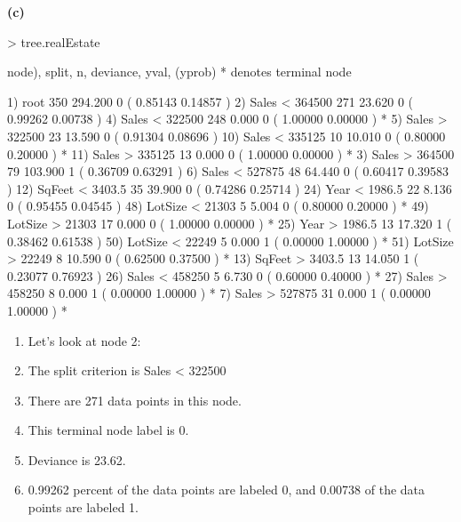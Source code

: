 \documentclass[a4paper]{article}
\renewcommand{\part}[1] {\vspace{.10in} {\bf (#1)}}
\begin{document}
\part{c}
\begin{Schunk}
\begin{Sinput}
> tree.realEstate
\end{Sinput}
\begin{Soutput}
node), split, n, deviance, yval, (yprob)
      * denotes terminal node

 1) root 350 294.200 0 ( 0.85143 0.14857 )  
   2) Sales < 364500 271  23.620 0 ( 0.99262 0.00738 )  
     4) Sales < 322500 248   0.000 0 ( 1.00000 0.00000 ) *
     5) Sales > 322500 23  13.590 0 ( 0.91304 0.08696 )  
      10) Sales < 335125 10  10.010 0 ( 0.80000 0.20000 ) *
      11) Sales > 335125 13   0.000 0 ( 1.00000 0.00000 ) *
   3) Sales > 364500 79 103.900 1 ( 0.36709 0.63291 )  
     6) Sales < 527875 48  64.440 0 ( 0.60417 0.39583 )  
      12) SqFeet < 3403.5 35  39.900 0 ( 0.74286 0.25714 )  
        24) Year < 1986.5 22   8.136 0 ( 0.95455 0.04545 )  
          48) LotSize < 21303 5   5.004 0 ( 0.80000 0.20000 ) *
          49) LotSize > 21303 17   0.000 0 ( 1.00000 0.00000 ) *
        25) Year > 1986.5 13  17.320 1 ( 0.38462 0.61538 )  
          50) LotSize < 22249 5   0.000 1 ( 0.00000 1.00000 ) *
          51) LotSize > 22249 8  10.590 0 ( 0.62500 0.37500 ) *
      13) SqFeet > 3403.5 13  14.050 1 ( 0.23077 0.76923 )  
        26) Sales < 458250 5   6.730 0 ( 0.60000 0.40000 ) *
        27) Sales > 458250 8   0.000 1 ( 0.00000 1.00000 ) *
     7) Sales > 527875 31   0.000 1 ( 0.00000 1.00000 ) *
\end{Soutput}
\end{Schunk}
{\color{red}
\begin{enumerate}
\item Let's look at node 2:
\item The split criterion is Sales < 322500
\item There are 271 data points in this node.
\item This terminal node label is 0.
\item Deviance is 23.62.
\item 0.99262 percent of the data points are labeled 0, and 0.00738 of the data points are labeled 1.
\end{enumerate}
}
\end{document}
